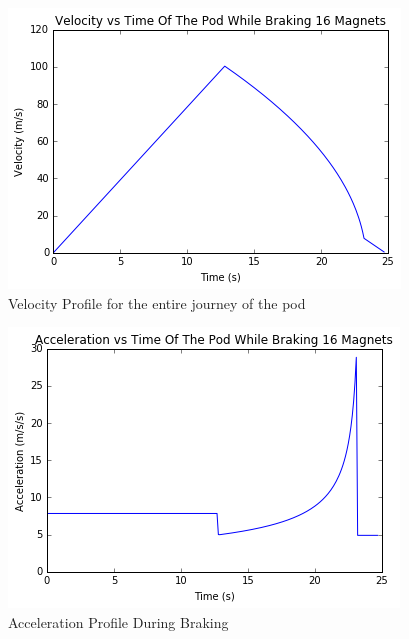\documentclass[main.tex]{subfiles}
\begin{document}
    \begin{figure}[H]
        \centering
        \includegraphics[width=\linewidth]{images/totalvelocityprofile}
        \caption{Velocity Profile for the entire journey of the pod}
        \label{fig:total-velocity-profile}
    \end{figure}
    \begin{figure}[H]
        \centering
        \includegraphics[width=\linewidth]{images/totalaccelerationprofile}
        \caption{Acceleration Profile During Braking}
        \label{fig:total-accelation-profile}
    \end{figure} 
\end{document}
